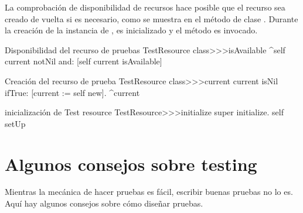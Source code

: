 \documentclass[a4paper,10pt,twoside]{book}
\begin{document}
La comprobaci\'on de disponibilidad de recursos hace posible que el recurso sea creado de vuelta si es necesario,
como se muestra en el m\'etodo de clase . Durante la
creaci\'on de la instancia de  , es inicializado y el m\'etodo  
es invocado.



\begin{method}[testresourceisavailable]{Disponibilidad del recurso de pruebas}
TestResource class>>>isAvailable
	^self current notNil and: [self current isAvailable]
\end{method}
\begin{method}[testresourcecurrent]{Creaci\'on del recurso de prueba}
TestResource class>>>current
	current isNil ifTrue: [current := self new].
	^current
\end{method}
\begin{method}[restresourceinitialize]{inicializaci\'on de Test resource }
TestResource>>>initialize
	super initialize.
	self setUp
\end{method}
\section{Algunos consejos sobre testing}

Mientras la mec\'anica de hacer pruebas es f\'acil, escribir buenas pruebas no lo es.
Aqu\'i hay algunos consejos sobre c\'omo dise\~nar pruebas.
\end{document}
